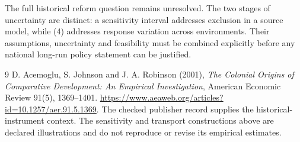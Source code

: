 \documentclass[11pt,a4paper]{article}
\begin{document}
The full historical reform question remains unresolved. The two stages of uncertainty are distinct: a sensitivity interval addresses exclusion in a source model, while (4) addresses response variation across environments. Their assumptions, uncertainty and feasibility must be combined explicitly before any national long-run policy statement can be justified.

\begin{thebibliography}{9}
 D. Acemoglu, S. Johnson and J. A. Robinson (2001), \emph{The Colonial Origins of Comparative Development: An Empirical Investigation}, American Economic Review 91(5), 1369--1401. \url{https://www.aeaweb.org/articles?id=10.1257/aer.91.5.1369}. The checked publisher record supplies the historical-instrument context. The sensitivity and transport constructions above are declared illustrations and do not reproduce or revise its empirical estimates.
\end{thebibliography}
\end{document}
